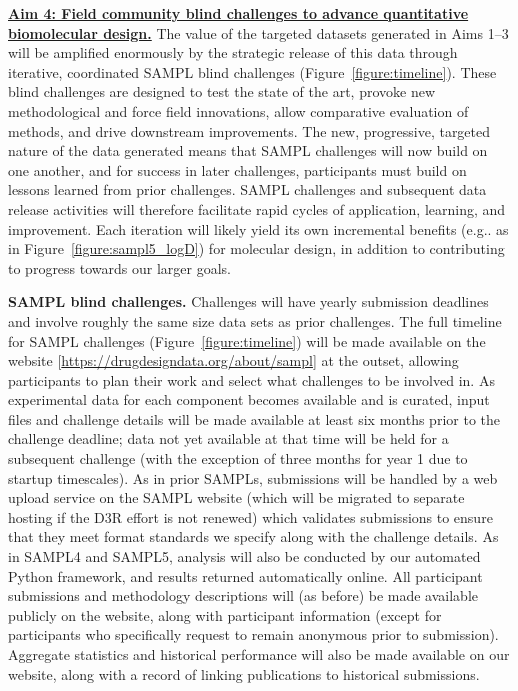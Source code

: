 \documentclass[11pt]{article}
\begin{document}
\eject

\textbf{\underline{Aim 4: Field community blind challenges to advance quantitative biomolecular design.}}
The value of the targeted datasets generated in Aims 1--3 will be amplified enormously by the strategic release of this data through iterative, coordinated SAMPL blind challenges (Figure~\ref{figure:timeline}).
These blind challenges are designed to test the state of the art, provoke new methodological and force field innovations, allow comparative evaluation of methods, and drive downstream improvements.
The new, progressive, targeted nature of the data generated means that SAMPL challenges will now build on one another, and for success in later challenges, participants must build on lessons learned from prior challenges.
SAMPL challenges and subsequent data release activities will therefore facilitate rapid cycles of application, learning, and improvement.
Each iteration will likely yield its own incremental benefits (e.g.. as in Figure~\ref{figure:sampl5_logD}) for molecular design, in addition to contributing to progress towards our larger goals.

{\bf SAMPL blind challenges.} Challenges will have yearly submission deadlines and involve roughly the same size data sets as prior challenges.
The full timeline for SAMPL challenges (Figure~\ref{figure:timeline}) will be made available on the website [\url{https://drugdesigndata.org/about/sampl}] at the outset, allowing participants to plan their work and select what challenges to be involved in.
As experimental data for each component becomes available and is curated, input files and challenge details will be made available at least six months prior to the challenge deadline; data not yet available at that time will be held for a subsequent challenge (with the exception of three months for year 1 due to startup timescales).
As in prior SAMPLs, submissions will be handled by a web upload service on the SAMPL website (which will be migrated to separate hosting if the D3R effort is not renewed) which validates submissions to ensure that they meet format standards we specify along with the challenge details. 
As in SAMPL4 and SAMPL5, analysis will also be conducted by our automated Python framework, and results returned automatically online.
All participant submissions and methodology descriptions will (as before) be made available publicly on the website, along with participant information (except for participants who specifically request to remain anonymous prior to submission).
Aggregate statistics and historical performance will also be made available on our website, along with a record of linking publications to historical submissions.
\end{document}
